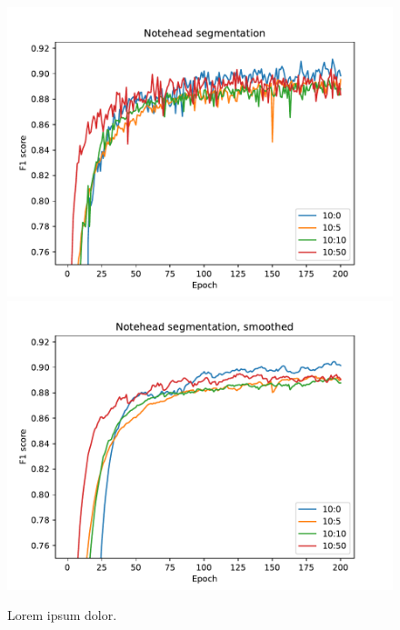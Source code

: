\begin{figure}[p]
    \centering
    \includegraphics[width=140mm]{../../figures/01-exploration-noteheads/noteheads-dropout.pdf}
    \includegraphics[width=140mm]{../../figures/01-exploration-noteheads/noteheads-dropout-smooth.pdf}
    \caption{Lorem ipsum dolor.}
    \label{fig:ExplorationNoteheads}
\end{figure}

